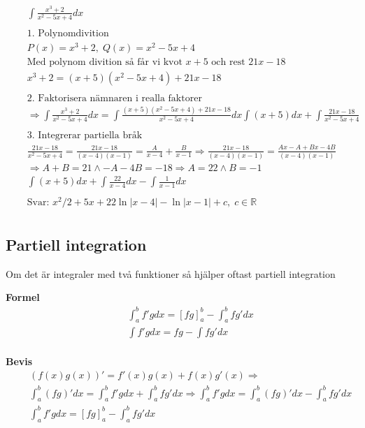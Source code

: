 \begin{align*}
  &\quad  \int \frac{x^3+2}{x^2-5x+4}dx \\
  &\quad  \\
  &\quad  \text{1. Polynomdivition} \\
  &\quad  P(x)=x^3+2, \; Q(x)=x^2-5x+4 \\
  &\quad  \text{Med polynom divition så får vi kvot $x+5$ och rest $21x-18$} \\
  &\quad  x^3+2=(x+5)(x^2-5x+4) + 21x-18 \\
  &\quad  \\
  &\quad  \text{2. Faktorisera nämnaren i realla faktorer} \\
  &\quad  \Rightarrow \int \frac{x^3+2}{x^2-5x+4}dx = \int \frac{(x+5)(x^2-5x+4) + 21x-18}{x^2-5x+4}dx
  \int (x+5)dx + \int \frac{21x-18}{x^2-5x+4} \\
  &\quad  \\
  &\quad  \text{3. Integrerar partiella bråk} \\
  &\quad  \frac{21x-18}{x^2-5x+4} = \frac{21x-18}{(x-4)(x-1)} = \frac{A}{x-4} + \frac{B}{x-1}
  \Rightarrow \frac{21x-18}{(x-4)(x-1)} = \frac{Ax-A+Bx-4B}{(x-4)(x-1)} \\
  &\quad  \Rightarrow A+B=21 \land -A-4B=-18 \Rightarrow A=22 \land B=-1 \\
  &\quad  \int (x+5)dx + \int \frac{22}{x-4}dx - \int \frac{1}{x-1}dx \\
  &\quad  \\
  &\quad  \text{Svar: } x^2/2 +5x +22\ln{|x-4|} -\ln{|x-1|} +c, \; c \in \mathbb{R} \\
\end{align*}


\newpage


\subsection{Partiell integration}
Om det är integraler med två funktioner så hjälper oftast partiell integration

\textbf{Formel}
\begin{align*}
  &\quad  \int_a^b f'g dx={[fg]}_a^b-\int_a^b fg' dx \\
  &\quad  \int f'g dx= fg-\int fg' dx \\
\end{align*}

\textbf{Bevis}
\begin{align*}
  &\quad  (f(x)g(x))'=f'(x)g(x)+f(x)g'(x) \Rightarrow \\
  &\quad  \int_a^b (fg)' dx= \int_a^b f'g dx + \int_a^b fg' dx
  \Rightarrow  \int_a^b f'g dx = \int_a^b (fg)' dx - \int_a^b fg' dx \\
  &\quad \int_a^b f'g dx={[fg]}_a^b-\int_a^b fg' dx \\
\end{align*}


